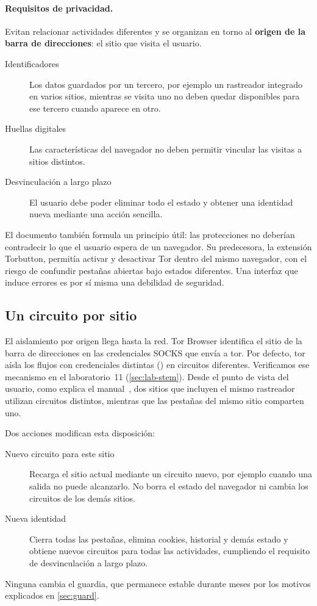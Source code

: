 \paragraph{Requisitos de privacidad.} Evitan relacionar actividades diferentes y se organizan en torno al \textbf{origen de la barra de direcciones}: el sitio que visita el usuario.
\begin{description}
  \item[Identificadores] Los datos guardados por un tercero, por ejemplo un rastreador integrado en varios sitios, mientras se visita uno no deben quedar disponibles para ese tercero cuando aparece en otro.
  \item[Huellas digitales] Las características del navegador no deben permitir vincular las visitas a sitios distintos.
  \item[Desvinculación a largo plazo] El usuario debe poder eliminar todo el estado y obtener una identidad nueva mediante una acción sencilla.
\end{description}

El documento también formula un principio útil: las protecciones no deberían contradecir lo que el usuario espera de un navegador. Su predecesora, la extensión Torbutton, permitía activar y desactivar Tor dentro del mismo navegador, con el riesgo de confundir pestañas abiertas bajo estados diferentes. Una interfaz que induce errores es por sí misma una debilidad de seguridad.

\subsection{Un circuito por sitio}

El aislamiento por origen llega hasta la red. Tor Browser identifica el sitio de la barra de direcciones en las credenciales SOCKS que envía a tor. Por defecto, tor aísla los flujos con credenciales distintas () en circuitos diferentes. Verificamos ese mecanismo en el laboratorio~11 (\cref{sec:lab-stem}). Desde el punto de vista del usuario, como explica el manual~\cite{tbmanual}, dos sitios que incluyen el mismo rastreador utilizan circuitos distintos, mientras que las pestañas del mismo sitio comparten uno.

Dos acciones modifican esta disposición:
\begin{description}
  \item[Nuevo circuito para este sitio] Recarga el sitio actual mediante un circuito nuevo, por ejemplo cuando una salida no puede alcanzarlo. No borra el estado del navegador ni cambia los circuitos de los demás sitios.
  \item[Nueva identidad] Cierra todas las pestañas, elimina cookies, historial y demás estado y obtiene nuevos circuitos para todas las actividades, cumpliendo el requisito de desvinculación a largo plazo.
\end{description}
Ninguna cambia el guardia, que permanece estable durante meses por los motivos explicados en \cref{sec:guard}.

